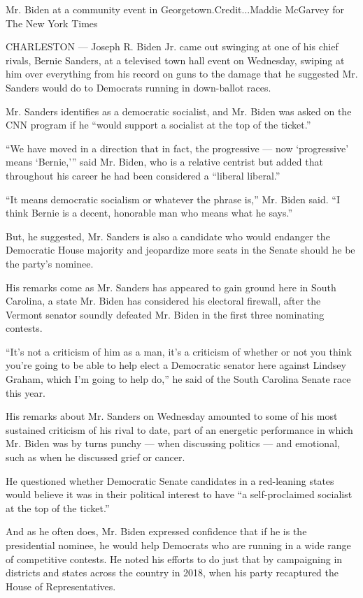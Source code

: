 Mr. Biden at a community event in Georgetown.Credit...Maddie McGarvey
for The New York Times

CHARLESTON --- Joseph R. Biden Jr. came out swinging at one of his chief
rivals, Bernie Sanders, at a televised town hall event on Wednesday,
swiping at him over everything from his record on guns to the damage
that he suggested Mr. Sanders would do to Democrats running in
down-ballot races.

Mr. Sanders identifies as a democratic socialist, and Mr. Biden was
asked on the CNN program if he ``would support a socialist at the top of
the ticket.''

``We have moved in a direction that in fact, the progressive --- now
`progressive' means `Bernie,''' said Mr. Biden, who is a relative
centrist but added that throughout his career he had been considered a
``liberal liberal.''

``It means democratic socialism or whatever the phrase is,'' Mr. Biden
said. ``I think Bernie is a decent, honorable man who means what he
says.''

But, he suggested, Mr. Sanders is also a candidate who would endanger
the Democratic House majority and jeopardize more seats in the Senate
should he be the party's nominee.

His remarks come as Mr. Sanders has appeared to gain ground here in
South Carolina, a state Mr. Biden has considered his electoral firewall,
after the Vermont senator soundly defeated Mr. Biden in the first three
nominating contests.

``It's not a criticism of him as a man, it's a criticism of whether or
not you think you're going to be able to help elect a Democratic senator
here against Lindsey Graham, which I'm going to help do,'' he said of
the South Carolina Senate race this year.

His remarks about Mr. Sanders on Wednesday amounted to some of his most
sustained criticism of his rival to date, part of an energetic
performance in which Mr. Biden was by turns punchy --- when discussing
politics --- and emotional, such as when he discussed grief or cancer.

He questioned whether Democratic Senate candidates in a red-leaning
states would believe it was in their political interest to have ``a
self-proclaimed socialist at the top of the ticket.''

And as he often does, Mr. Biden expressed confidence that if he is the
presidential nominee, he would help Democrats who are running in a wide
range of competitive contests. He noted his efforts to do just that by
campaigning in districts and states across the country in 2018, when his
party recaptured the House of Representatives.

